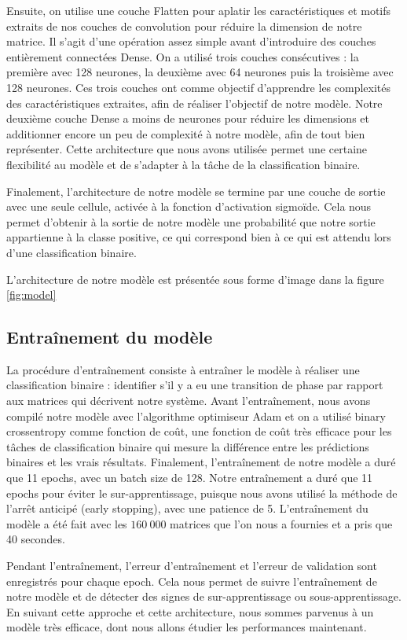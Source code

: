\documentclass[11pt, parskip=half]{scrartcl} %
\begin{document}
Ensuite, on utilise une couche Flatten pour aplatir les caractéristiques et motifs extraits de nos couches de convolution pour réduire la dimension de notre matrice. Il s’agit d’une opération assez simple avant d’introduire des couches entièrement connectées Dense. On a utilisé trois couches consécutives : la première avec 128 neurones, la deuxième avec 64 neurones puis la troisième avec 128 neurones. Ces trois couches ont comme objectif d’apprendre les complexités des caractéristiques extraites, afin de réaliser l’objectif de notre modèle. Notre deuxième couche Dense a moins de neurones pour réduire les dimensions et additionner encore un peu de complexité à notre modèle, afin de tout bien représenter. Cette architecture que nous avons utilisée permet une certaine flexibilité au modèle et de s’adapter à la tâche de la classification binaire.

Finalement, l’architecture de notre modèle se termine par une couche de sortie avec une seule cellule, activée à la fonction d’activation sigmoïde. Cela nous permet d’obtenir à la sortie de notre modèle une probabilité que notre sortie appartienne à la classe positive, ce qui correspond bien à ce qui est attendu lors d’une classification binaire.

L’architecture de notre modèle est présentée sous forme d’image dans la figure \ref{fig:model}

\subsection{Entraînement du modèle}
La procédure d’entraînement consiste à entraîner le modèle à réaliser une classification binaire : identifier s’il y a eu une transition de phase par rapport aux matrices qui décrivent notre système. Avant l’entraînement, nous avons compilé notre modèle avec l’algorithme optimiseur Adam et on a utilisé binary crossentropy comme fonction de coût, une fonction de coût très efficace pour les tâches de classification binaire qui mesure la différence entre les prédictions binaires et les vrais résultats. Finalement, l’entraînement de notre modèle a duré que 11 epochs, avec un batch size de 128. Notre entraînement a duré que 11 epochs pour éviter le sur-apprentissage, puisque nous avons utilisé la méthode de l’arrêt anticipé (early stopping), avec une patience de 5. L’entraînement du modèle a été fait avec les $160 \ 000$ matrices que l'on nous a fournies et a pris que 40 secondes.

Pendant l’entraînement, l’erreur d’entraînement et l’erreur de validation sont enregistrés pour chaque epoch. Cela nous permet de suivre l’entraînement de notre modèle et de détecter des signes de sur-apprentissage ou sous-apprentissage. En suivant cette approche et cette architecture, nous sommes parvenus à un modèle très efficace, dont nous allons étudier les performances maintenant.
\end{document}
